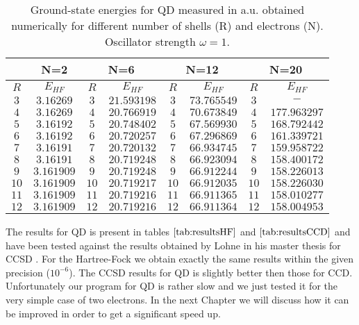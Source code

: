 \documentclass[twoside,english]{uiofysmaster}
\theoremstyle{definition}
\begin{document}
\begin{table}[h!]
	\begin{center}
		\begin{tabular}{|c c| c c| c c| c c|}
			\hline
			\multirow{2}{*}{} & 
			\multicolumn{1}{c}{N=2} \vline& 
			\multicolumn{2}{c}{N=6} \vline&
			\multicolumn{2}{c}{N=12} \vline&
			\multicolumn{2}{c}{N=20} \vline\\
			\hline
			$R$  & $E_{HF}$ & $R$ & $E_{HF}$ & $R$  & $E_{HF}$ &$R$ &  $E_{HF}$  \\
			\hline
			$  3 $   & $3.16269$  &$ 3 $  & $21.593198$  &$  3 $   & $73.765549$   &$ 3$  & $-          $   \\
			$  4 $   & $3.16269$  &$ 4 $  & $20.766919$  &$  4 $   & $70.673849$   &$ 4$  & $177.963297 $   \\
			$  5 $   & $3.16192$  &$ 5 $  & $20.748402$  &$  5 $   & $67.569930$   &$ 5$  & $168.792442 $   \\
			$  6 $   & $3.16192$  &$ 6 $  & $20.720257$  &$  6 $   & $67.296869$   &$ 6$  & $161.339721 $   \\
			$  7 $   & $3.16191$  &$ 7 $  & $20.720132$  &$  7 $   & $66.934745$   &$ 7$  & $159.958722 $   \\
			$  8 $   & $3.16191$  &$ 8 $  & $20.719248$  &$  8 $   & $66.923094$   &$ 8$  & $158.400172 $   \\
			$  9 $   & $3.161909$ &$ 9 $  & $20.719248$  &$  9 $   & $66.912244$   &$ 9$  & $158.226013 $   \\
			$  10$   & $3.161909$ &$ 10$  & $20.719217$  &$  10$   & $66.912035$   &$ 10$ & $158.226030 $   \\
			$  11$   & $3.161909$ &$ 11$  & $20.719216$  &$  11$   & $66.911365$   &$ 11$ & $158.010277 $   \\
			$  12$   & $3.161909$ &$ 12$  & $20.719216$  &$  12$   & $66.911364$   &$ 12$ & $158.004953 $   \\
			\hline                                                                                    
		\end{tabular}
		\caption{ Ground-state energies for QD measured in a.u. obtained numerically for different number of shells (R) and electrons (N).  Oscillator strength $\omega=1$.}   \label{tab:resultsHF}
	\end{center}
\end{table}

The results for QD is present in tables $\ref{tab:resultsHF}$ and  $\ref{tab:resultsCCD}$ and have been tested against the results obtained by Lohne in his master thesis for CCSD \cite{lohneCOUPLEDCLUSTERSTUDIESQUANTUM}. For the Hartree-Fock we obtain exactly the same results within the given precision ($10^{-6}$). The CCSD results for QD is slightly better then those for CCD. Unfortunately our program for QD is rather slow and we just tested it for the very simple case of two electrons. In the next Chapter we will discuss how it can be improved in order to get a significant speed up.  
\end{document}

